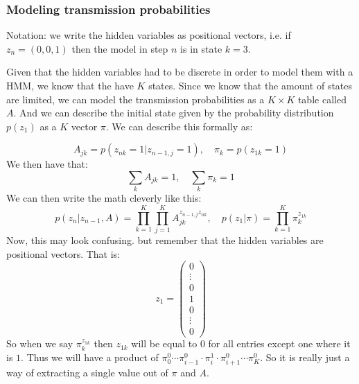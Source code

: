     \subsubsection{Modeling transmission probabilities}
    Notation: we write the hidden variables as positional vectors, i.e. if 
    $z_n=(0,0,1)$ then the model in step $n$ is in state $k=3$.
    
    Given that the hidden variables had to be discrete in order to model them 
    with a HMM, we know that the have $K$ states. Since we know that the amount 
    of states are limited, we can model the transmission probabilities as a 
    $K\times K$ table called $A$. And we can describe the initial state given 
    by the probability distribution $p(z_1)$ as a $K$ vector $\pi$. We can 
    describe this formally as:
    
    \begin{equation*}
        A_{jk} = p(z_{nk}=1|z_{n-1,j}=1), \quad \pi_k = p(z_{1k}=1)
    \end{equation*}
    We then have that:
    \begin{equation*}
        \sum_{k}A_{jk}=1,\quad \sum_k \pi_k=1
    \end{equation*}
    We can then write the math cleverly like this:
    \begin{equation*}
        p(z_n|z_{n-1},A)=\prod_{k=1}^{K}\prod_{j=1}^{K}A_{jk}^{z_{n-1,j}z_{nk}},
        \quad p(z_1|\pi)=\prod_{k=1}^{K}\pi_k^{z_{1k}}
    \end{equation*}
    Now, this may look confusing. but remember that the hidden variables are 
    positional vectors. That is: 
    \begin{equation*}
        z_1=\begin{pmatrix}
            0\\
            \vdots\\
            0\\
            1\\
            0\\
            \vdots\\
            0
        \end{pmatrix}
    \end{equation*}
    So when we say $\pi_k^{z_{1k}}$ then $z_{1k}$ will be equal to $0$ for all 
    entries except one where it is $1$. Thus we will have a product of $\pi_0^0 
    \cdots \pi_{i-1}^0 \cdot \pi_{i}^1 \cdot \pi_{i+1}^0 \cdots \pi_K^0$. So it 
    is really just a way of extracting a single value out of $\pi$ and $A$.
    
